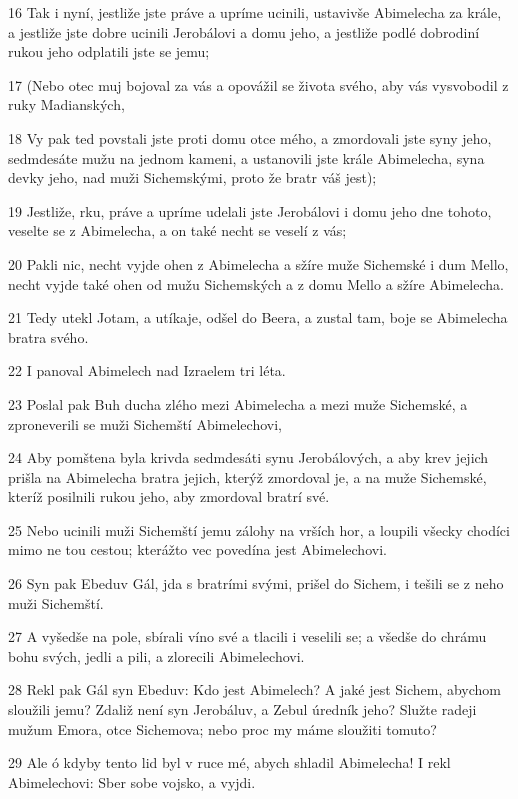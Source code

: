 \par 16 Tak i nyní, jestliže jste práve a upríme ucinili, ustavivše Abimelecha za krále, a jestliže jste dobre ucinili Jerobálovi a domu jeho, a jestliže podlé dobrodiní rukou jeho odplatili jste se jemu;
\par 17 (Nebo otec muj bojoval za vás a opovážil se života svého, aby vás vysvobodil z ruky Madianských,
\par 18 Vy pak ted povstali jste proti domu otce mého, a zmordovali jste syny jeho, sedmdesáte mužu na jednom kameni, a ustanovili jste krále Abimelecha, syna devky jeho, nad muži Sichemskými, proto že bratr váš jest);
\par 19 Jestliže, rku, práve a upríme udelali jste Jerobálovi i domu jeho dne tohoto, veselte se z Abimelecha, a on také necht se veselí z vás;
\par 20 Pakli nic, necht vyjde ohen z Abimelecha a sžíre muže Sichemské i dum Mello, necht vyjde také ohen od mužu Sichemských a z domu Mello a sžíre Abimelecha.
\par 21 Tedy utekl Jotam, a utíkaje, odšel do Beera, a zustal tam, boje se Abimelecha bratra svého.
\par 22 I panoval Abimelech nad Izraelem tri léta.
\par 23 Poslal pak Buh ducha zlého mezi Abimelecha a mezi muže Sichemské, a zproneverili se muži Sichemští Abimelechovi,
\par 24 Aby pomštena byla krivda sedmdesáti synu Jerobálových, a aby krev jejich prišla na Abimelecha bratra jejich, kterýž zmordoval je, a na muže Sichemské, kteríž posilnili rukou jeho, aby zmordoval bratrí své.
\par 25 Nebo ucinili muži Sichemští jemu zálohy na vrších hor, a loupili všecky chodíci mimo ne tou cestou; kterážto vec povedína jest Abimelechovi.
\par 26 Syn pak Ebeduv Gál, jda s bratrími svými, prišel do Sichem, i tešili se z neho muži Sichemští.
\par 27 A vyšedše na pole, sbírali víno své a tlacili i veselili se; a všedše do chrámu bohu svých, jedli a pili, a zlorecili Abimelechovi.
\par 28 Rekl pak Gál syn Ebeduv: Kdo jest Abimelech? A jaké jest Sichem, abychom sloužili jemu? Zdaliž není syn Jerobáluv, a Zebul úredník jeho? Služte radeji mužum Emora, otce Sichemova; nebo proc my máme sloužiti tomuto?
\par 29 Ale ó kdyby tento lid byl v ruce mé, abych shladil Abimelecha! I rekl Abimelechovi: Sber sobe vojsko, a vyjdi.
